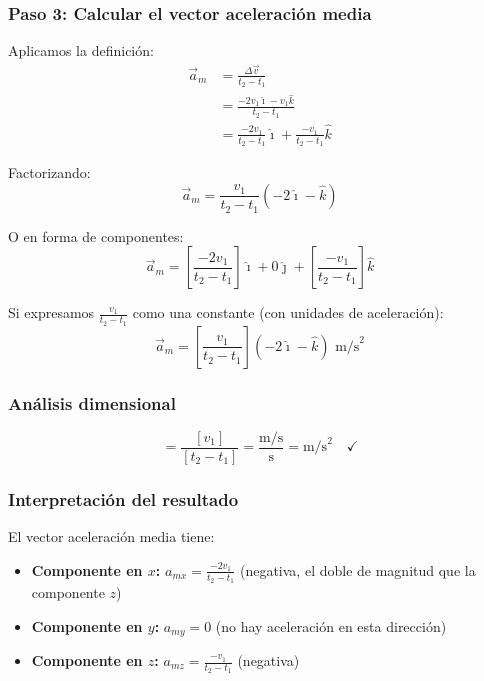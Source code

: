 \documentclass[12pt, a4paper]{article}
\begin{document}
\subsubsection*{Paso 3: Calcular el vector aceleración media}

Aplicamos la definición:
\begin{align*}
\vec{a}_m &= \frac{\Delta \vec{v}}{t_2 - t_1} \\
&= \frac{-2v_1\hat{\imath} - v_1\hat{k}}{t_2 - t_1} \\
&= \frac{-2v_1}{t_2 - t_1}\hat{\imath} + \frac{-v_1}{t_2 - t_1}\hat{k}
\end{align*}

Factorizando:
\begin{equation}
\vec{a}_m = \frac{v_1}{t_2 - t_1}(-2\hat{\imath} - \hat{k})
\end{equation}

O en forma de componentes:
\begin{equation}
\vec{a}_m = \left[\frac{-2v_1}{t_2 - t_1}\right]\hat{\imath} + 0\hat{\jmath} + \left[\frac{-v_1}{t_2 - t_1}\right]\hat{k}
\end{equation}

Si expresamos $\frac{v_1}{t_2 - t_1}$ como una constante (con unidades de aceleración):
\begin{equation}
\boxed{\vec{a}_m = \left[\frac{v_1}{t_2 - t_1}\right](-2\hat{\imath} - \hat{k}) \text{ m/s}^2}
\end{equation}

\subsubsection*{Análisis dimensional}
\begin{equation}
[\vec{a}_m] = \frac{[v_1]}{[t_2 - t_1]} = \frac{\text{m/s}}{\text{s}} = \text{m/s}^2 \quad \checkmark
\end{equation}

\subsubsection*{Interpretación del resultado}

El vector aceleración media tiene:
\begin{itemize}
    \item \textbf{Componente en $x$:} $a_{mx} = \frac{-2v_1}{t_2-t_1}$ (negativa, el doble de magnitud que la componente $z$)
    \item \textbf{Componente en $y$:} $a_{my} = 0$ (no hay aceleración en esta dirección)
    \item \textbf{Componente en $z$:} $a_{mz} = \frac{-v_1}{t_2-t_1}$ (negativa)
\end{itemize}
\end{document}
